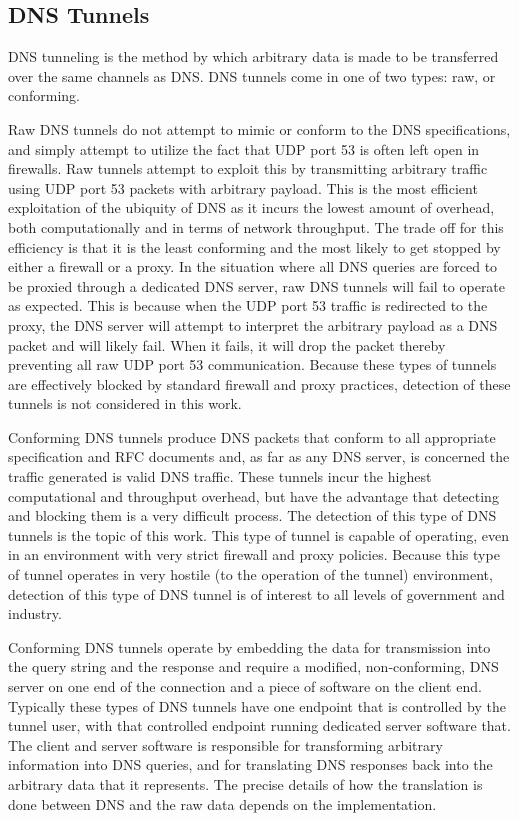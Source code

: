 \documentclass[12pt]{article}
\theoremstyle{remark}
\theoremstyle{definition}
\theoremstyle{definition}
\theoremstyle{definition}
\begin{document}
\subsection{DNS Tunnels}
\label{dnstunnels.types}

DNS tunneling is the method by which arbitrary data is made to be transferred
over the same channels as DNS. DNS tunnels come in one of two types: raw, or
conforming.

\label{dnstunnels.types.raw}
Raw DNS tunnels do not attempt to mimic or conform to the DNS
specifications, and simply attempt to utilize the fact that UDP port 53 is
often left open in firewalls. Raw tunnels attempt to exploit this by
transmitting arbitrary traffic using UDP port 53 packets with arbitrary payload.
This is the most efficient exploitation of the ubiquity of DNS as it incurs the
lowest amount of overhead, both computationally and in terms of network
throughput. The trade off for this efficiency is that it is the least
conforming and the most likely to get stopped by either a firewall or a proxy.
In the situation where all DNS queries are forced to be proxied through a
dedicated DNS server, raw DNS tunnels will fail to operate as expected. This is
because when the UDP port 53 traffic is redirected to the proxy, the DNS server
will attempt to interpret the arbitrary payload as a DNS packet and will likely
fail. When it fails, it will drop the packet thereby preventing all raw UDP
port 53 communication. Because these types of tunnels are effectively blocked by
standard firewall and proxy practices, detection of these tunnels is not
considered in this work.

\label{dnstunnels.types.conforming}
Conforming DNS tunnels produce DNS packets that conform to all appropriate
specification and RFC documents and, as far as any DNS server, is concerned the
traffic generated is valid DNS traffic. These tunnels incur the highest
computational and throughput overhead, but have the advantage that detecting
and blocking them is a very difficult process. The detection of this type of
DNS tunnels is the topic of this work. This type of tunnel is capable of
operating, even in an environment with very strict firewall and proxy policies.
Because this type of tunnel operates in very hostile (to the operation of the
tunnel) environment, detection of this type of DNS tunnel is of interest to all
levels of government and industry.

Conforming DNS tunnels operate by embedding the data for transmission into the
query string and the response and require a modified, non-conforming, DNS
server on one end of the connection and a piece of software on the client end.
Typically these types of DNS tunnels have one endpoint that is controlled by the
tunnel user, with that controlled endpoint running dedicated server software
that. The client and server software is responsible for transforming arbitrary
information into DNS queries, and for translating DNS responses back into the
arbitrary data that it represents. The precise details of how the translation
is done between DNS and the raw data depends on the implementation.
\end{document}

